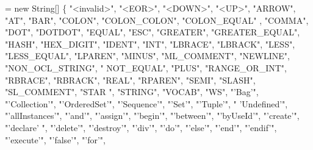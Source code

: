 \begin{DoxyCode}
= \textcolor{keyword}{new} String[] \{
        \textcolor{stringliteral}{"<invalid>"}, \textcolor{stringliteral}{"<EOR>"}, \textcolor{stringliteral}{"<DOWN>"}, \textcolor{stringliteral}{"<UP>"}, \textcolor{stringliteral}{"ARROW"}, \textcolor{stringliteral}{"AT"}, \textcolor{stringliteral}{"BAR"}, \textcolor{stringliteral}{"COLON"}, \textcolor{stringliteral}{"COLON\_COLON"}, \textcolor{stringliteral}{"COLON\_EQUAL"}
      , \textcolor{stringliteral}{"COMMA"}, \textcolor{stringliteral}{"DOT"}, \textcolor{stringliteral}{"DOTDOT"}, \textcolor{stringliteral}{"EQUAL"}, \textcolor{stringliteral}{"ESC"}, \textcolor{stringliteral}{"GREATER"}, \textcolor{stringliteral}{"GREATER\_EQUAL"}, \textcolor{stringliteral}{"HASH"}, \textcolor{stringliteral}{"HEX\_DIGIT"}, \textcolor{stringliteral}{"IDENT"}, \textcolor{stringliteral}{"INT"},
       \textcolor{stringliteral}{"LBRACE"}, \textcolor{stringliteral}{"LBRACK"}, \textcolor{stringliteral}{"LESS"}, \textcolor{stringliteral}{"LESS\_EQUAL"}, \textcolor{stringliteral}{"LPAREN"}, \textcolor{stringliteral}{"MINUS"}, \textcolor{stringliteral}{"ML\_COMMENT"}, \textcolor{stringliteral}{"NEWLINE"}, \textcolor{stringliteral}{"NON\_OCL\_STRING"}, \textcolor{stringliteral}{"
      NOT\_EQUAL"}, \textcolor{stringliteral}{"PLUS"}, \textcolor{stringliteral}{"RANGE\_OR\_INT"}, \textcolor{stringliteral}{"RBRACE"}, \textcolor{stringliteral}{"RBRACK"}, \textcolor{stringliteral}{"REAL"}, \textcolor{stringliteral}{"RPAREN"}, \textcolor{stringliteral}{"SEMI"}, \textcolor{stringliteral}{"SLASH"}, \textcolor{stringliteral}{"SL\_COMMENT"}, \textcolor{stringliteral}{"STAR
      "}, \textcolor{stringliteral}{"STRING"}, \textcolor{stringliteral}{"VOCAB"}, \textcolor{stringliteral}{"WS"}, \textcolor{stringliteral}{"'Bag'"}, \textcolor{stringliteral}{"'Collection'"}, \textcolor{stringliteral}{"'OrderedSet'"}, \textcolor{stringliteral}{"'Sequence'"}, \textcolor{stringliteral}{"'Set'"}, \textcolor{stringliteral}{"'Tuple'"}, \textcolor{stringliteral}{"
      'Undefined'"}, \textcolor{stringliteral}{"'allInstances'"}, \textcolor{stringliteral}{"'and'"}, \textcolor{stringliteral}{"'assign'"}, \textcolor{stringliteral}{"'begin'"}, \textcolor{stringliteral}{"'between'"}, \textcolor{stringliteral}{"'byUseId'"}, \textcolor{stringliteral}{"'create'"}, \textcolor{stringliteral}{"'declare'
      "}, \textcolor{stringliteral}{"'delete'"}, \textcolor{stringliteral}{"'destroy'"}, \textcolor{stringliteral}{"'div'"}, \textcolor{stringliteral}{"'do'"}, \textcolor{stringliteral}{"'else'"}, \textcolor{stringliteral}{"'end'"}, \textcolor{stringliteral}{"'endif'"}, \textcolor{stringliteral}{"'execute'"}, \textcolor{stringliteral}{"'false'"}, \textcolor{stringliteral}{"'for'"}, \textcolor{stringliteral}{
}
\end{DoxyCode}
